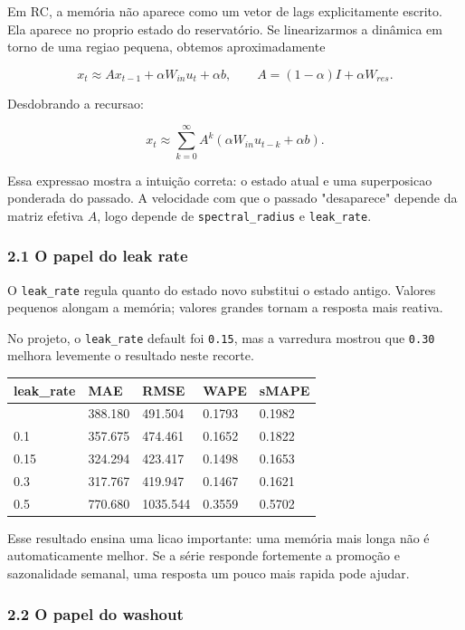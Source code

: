 \documentclass[12pt]{article}
\begin{document}
Em RC, a memória não aparece como um vetor de lags explicitamente escrito. Ela aparece no proprio estado do reservatório. Se linearizarmos a dinâmica em torno de uma regiao pequena, obtemos aproximadamente

\[
x_t \approx A x_{t-1} + \alpha W_{in} u_t + \alpha b,
\qquad
A = (1 - \alpha) I + \alpha W_{res}.
\]

Desdobrando a recursao:

\[
x_t \approx \sum_{k=0}^\infty A^k (\alpha W_{in} u_{t-k} + \alpha b).
\]

Essa expressao mostra a intuição correta: o estado atual e uma superposicao ponderada do passado. A velocidade com que o passado "desaparece" depende da matriz efetiva \(A\), logo depende de \texttt{spectral\_radius} e \texttt{leak\_rate}.

\subsubsection{2.1 O papel do leak rate}\label{21-o-papel-do-leak-rate}

O \texttt{leak\_rate} regula quanto do estado novo substitui o estado antigo. Valores pequenos alongam a memória; valores grandes tornam a resposta mais reativa.

No projeto, o \texttt{leak\_rate} default foi \texttt{0.15}, mas a varredura mostrou que \texttt{0.30} melhora levemente o resultado neste recorte.

\begin{longtable}[]{@{}lllll@{}}
\toprule\noalign{}
leak\_rate & MAE & RMSE & WAPE & sMAPE \\
\midrule\noalign{}
\endhead
\bottomrule\noalign{}
\endlastfoot
0.05 & 388.180 & 491.504 & 0.1793 & 0.1982 \\
0.1 & 357.675 & 474.461 & 0.1652 & 0.1822 \\
0.15 & 324.294 & 423.417 & 0.1498 & 0.1653 \\
0.3 & 317.767 & 419.947 & 0.1467 & 0.1621 \\
0.5 & 770.680 & 1035.544 & 0.3559 & 0.5702 \\
\end{longtable}

Esse resultado ensina uma licao importante: uma memória mais longa não é automaticamente melhor. Se a série responde fortemente a promoção e sazonalidade semanal, uma resposta um pouco mais rapida pode ajudar.

\subsubsection{2.2 O papel do washout}\label{22-o-papel-do-washout}
\end{document}
